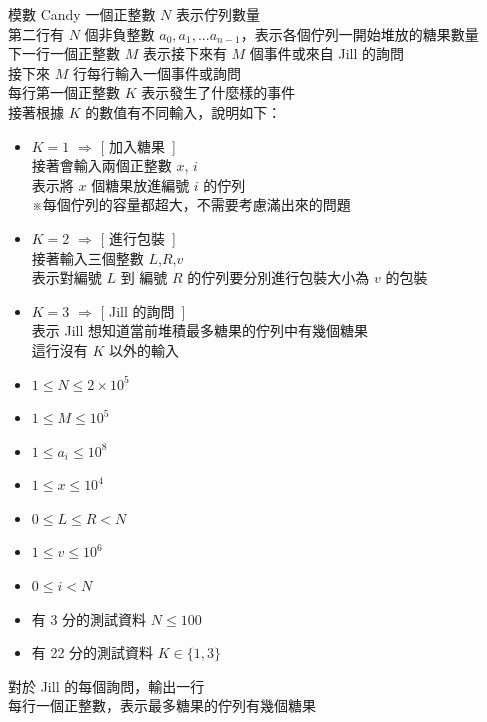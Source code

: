 \begin{problem}{模數 Candy}
一個正整數 $N$ 表示佇列數量 \\
第二行有 $N$ 個非負整數 $a_0,a_1,...a_{n-1}$，表示各個佇列一開始堆放的糖果數量\\
下一行一個正整數 $M$ 表示接下來有 $M$ 個事件或來自 Jill 的詢問 \\
接下來 $M$ 行每行輸入一個事件或詢問 \\
每行第一個正整數 $K$ 表示發生了什麼樣的事件 \\
接著根據 $K$ 的數值有不同輸入，說明如下：
\begin{itemize}
\item $K=1$ $\Rightarrow$ [ 加入糖果\ ] \\
接著會輸入兩個正整數 $x$, $i$ \\
表示將 $x$ 個糖果放進編號 $i$ 的佇列\\
※每個佇列的容量都超大，不需要考慮滿出來的問題
\item $K=2$ $\Rightarrow$ [ 進行包裝\ ] \\
接著輸入三個整數 $L$,$R$,$v$ \\
 表示對編號 $L$ 到 編號 $R$ 的佇列要分別進行包裝大小為 $v$ 的包裝
\item $K=3$ $\Rightarrow$ [ Jill 的詢問\ ] \\
表示 Jill 想知道當前堆積最多糖果的佇列中有幾個糖果\\
這行沒有 $K$ 以外的輸入
\end{itemize}

\begin{iofmt}
\begin{itemize}
	\item $1 \leq N \leq 2\times 10^5$ %
    \item $1 \leq M \leq 10^5$
    \item $1 \leq a_i \leq 10^8$
    \item $1 \leq x \leq 10^4$
	\item $0 \leq L \leq R < N$
	\item $1 \leq v \leq 10^6$
    \item $0 \leq i < N$
	\item 有 3 分的測試資料 $N \leq 100$
	\item 有 22 分的測試資料 $K \in \{1,3\}$
\end{itemize}
\end{iofmt}

\OutputFile

對於 Jill 的每個詢問，輸出一行\\
每行一個正整數，表示最多糖果的佇列有幾個糖果

\Examples

\begin{example}
\end{example}

\end{problem}
